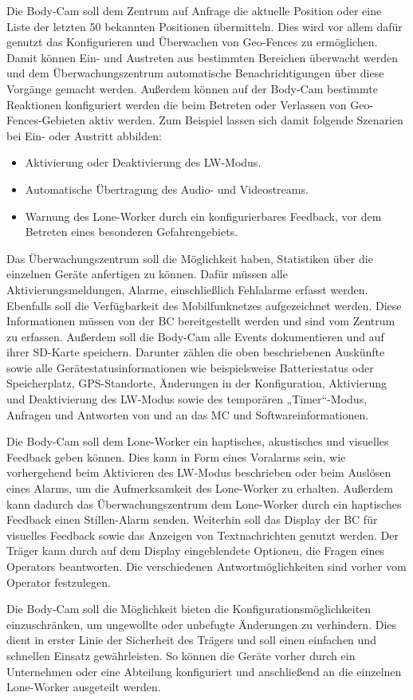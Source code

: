 \documentclass[thesis.tex]{subfiles}
\begin{document}
Die Body-Cam soll dem Zentrum auf Anfrage die aktuelle Position oder eine Liste der letzten 50 bekannten Positionen übermitteln.
Dies wird vor allem dafür genutzt das Konfigurieren und Überwachen von \glqq Geo-Fences\grqq{} zu ermöglichen.
Damit können Ein- und Austreten aus bestimmten Bereichen überwacht werden und dem Überwachungszentrum automatische Benachrichtigungen
über diese Vorgänge gemacht werden.
Außerdem können auf der Body-Cam bestimmte Reaktionen konfiguriert werden die beim Betreten oder Verlassen von \glqq Geo-Fences\grqq{}-Gebieten aktiv werden.
Zum Beispiel lassen sich damit folgende Szenarien bei Ein- oder Austritt abbilden:
\begin{itemize}
    \item Aktivierung oder Deaktivierung des LW-Modus.
    \item Automatische Übertragung des Audio- und Videostreams.
    \item Warnung des Lone-Worker durch ein konfigurierbares Feedback, vor dem Betreten eines besonderen Gefahrengebiets.
\end{itemize}

Das Überwachungszentrum soll die Möglichkeit haben, Statistiken über die einzelnen Geräte anfertigen zu können.
Dafür müssen alle Aktivierungsmeldungen, Alarme, einschließlich Fehlalarme erfasst werden.
Ebenfalls soll die Verfügbarkeit des Mobilfunknetzes aufgezeichnet werden.
Diese Informationen müssen von der BC bereitgestellt werden und sind vom Zentrum zu erfassen.
Außerdem soll die Body-Cam alle Events dokumentieren und auf ihrer SD-Karte speichern.
Darunter zählen die oben beschriebenen Auskünfte sowie alle Gerätestatusinformationen wie beispielsweise Batteriestatus
oder Speicherplatz, GPS-Standorte, Änderungen in der Konfiguration, Aktivierung und Deaktivierung des LW-Modus
sowie des temporären „Timer“-Modus, Anfragen und Antworten von und an das MC und Softwareinformationen.

Die Body-Cam soll dem Lone-Worker ein haptisches, akustisches und visuelles Feedback geben können.
Dies kann in Form eines Voralarms sein, wie vorhergehend beim Aktivieren des LW-Modus beschrieben oder beim Auslösen eines Alarms, um die Aufmerksamkeit des Lone-Worker zu erhalten.
Außerdem kann dadurch das Überwachungszentrum dem Lone-Worker durch ein haptisches Feedback einen \glqq Stillen\grqq{}-Alarm senden.
Weiterhin soll das Display der BC für visuelles Feedback sowie das Anzeigen von Textnachrichten genutzt werden.
Der Träger kann durch auf dem Display eingeblendete Optionen, die Fragen eines Operators beantworten.
Die verschiedenen Antwortmöglichkeiten sind vorher vom Operator festzulegen.

Die Body-Cam soll die Möglichkeit bieten die Konfigurationsmöglichkeiten einzuschränken, um ungewollte oder unbefugte Änderungen zu verhindern.
Dies dient in erster Linie der Sicherheit des Trägers und soll einen einfachen und schnellen Einsatz gewährleisten.
So können die Geräte vorher durch ein Unternehmen oder eine Abteilung konfiguriert und anschließend an die einzelnen Lone-Worker ausgeteilt werden.

\subfilebib %
\end{document}
